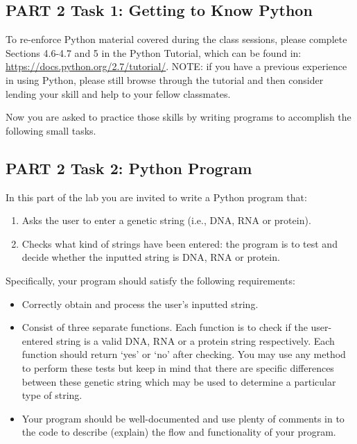\vspace*{-.1in}
\subsection*{PART 2  Task 1: Getting to Know Python}
\vspace*{-.1in} 

To re-enforce Python material covered during the class sessions, please complete Sections 4.6-4.7 and 5 in the Python Tutorial, which can be found in: \url{https://docs.python.org/2.7/tutorial/}. NOTE: if you have a previous experience in using Python, please still browse through the tutorial and then consider lending your skill and help to your fellow classmates.

\noindent Now you are asked to practice those skills by writing programs to accomplish the following small tasks.

\vspace*{-.1in}
\subsection*{PART 2  Task 2: Python Program}
\vspace*{-.1in} 

In this part of the lab you are invited to write a Python program that:

\begin{enumerate}
	\item Asks the user to enter a genetic string (i.e., DNA, RNA or protein).
	\item Checks what kind of strings have been entered: the program is to test and decide whether the inputted string is DNA, RNA or protein.
\end{enumerate}

\color{red}
\noindent Specifically, your program should satisfy the following requirements:
\begin{itemize}
	\item Correctly obtain and process the user's inputted string.
	\item Consist of three separate functions. Each function is to check if the user-entered string is a valid DNA, RNA or a protein string respectively. Each function should return `yes' or `no' after checking. You may use any method to perform these tests but keep in mind that there are specific differences between these genetic string which may be used to determine a particular type of string. 
	\item Your program should be well-documented and use plenty of comments in to the code to describe (explain) the flow and functionality of your program.
\end{itemize}
\color{black}


